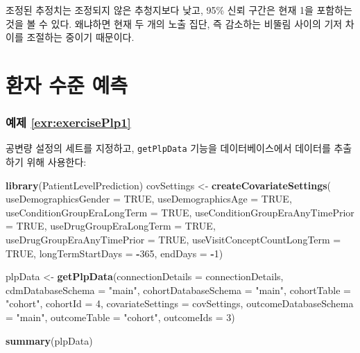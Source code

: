 \documentclass[11pt]{book}
\newenvironment{Shaded}{\begin{snugshade}}{\end{snugshade}}
\newcommand{\KeywordTok}[1]{\textcolor[rgb]{0.13,0.29,0.53}{\textbf{#1}}}
\newcommand{\DataTypeTok}[1]{\textcolor[rgb]{0.13,0.29,0.53}{#1}}
\newcommand{\DecValTok}[1]{\textcolor[rgb]{0.00,0.00,0.81}{#1}}
\newcommand{\StringTok}[1]{\textcolor[rgb]{0.31,0.60,0.02}{#1}}
\newcommand{\OtherTok}[1]{\textcolor[rgb]{0.56,0.35,0.01}{#1}}
\newcommand{\OperatorTok}[1]{\textcolor[rgb]{0.81,0.36,0.00}{\textbf{#1}}}
\newcommand{\NormalTok}[1]{#1}
\theoremstyle{definition}
\theoremstyle{definition}
\theoremstyle{definition}
\theoremstyle{remark}
\begin{document}
조정된 추정치는 조정되지 않은 추청지보다 낮고, 95\% 신뢰 구간은 현재 1을
포함하는 것을 볼 수 있다. 왜냐하면 현재 두 개의 노출 집단, 즉 감소하는
비뚤림 사이의 기저 차이를 조절하는 중이기 때문이다.

\section{환자 수준 예측}\label{Plpanswers}

\subsubsection*{예제 \ref{exr:exercisePlp1}}\label{-refexrexerciseplp1}

공변량 설정의 세트를 지정하고, \texttt{getPlpData} 기능을
데이터베이스에서 데이터를 추출하기 위해 사용한다:

\begin{Shaded}
\begin{Highlighting}[]
\KeywordTok{library}\NormalTok{(PatientLevelPrediction)}
\NormalTok{covSettings <-}\StringTok{ }\KeywordTok{createCovariateSettings}\NormalTok{(}
  \DataTypeTok{useDemographicsGender =} \OtherTok{TRUE}\NormalTok{,}
  \DataTypeTok{useDemographicsAge =} \OtherTok{TRUE}\NormalTok{,}
  \DataTypeTok{useConditionGroupEraLongTerm =} \OtherTok{TRUE}\NormalTok{,}
  \DataTypeTok{useConditionGroupEraAnyTimePrior =} \OtherTok{TRUE}\NormalTok{,}
  \DataTypeTok{useDrugGroupEraLongTerm =} \OtherTok{TRUE}\NormalTok{,}
  \DataTypeTok{useDrugGroupEraAnyTimePrior =} \OtherTok{TRUE}\NormalTok{,}
  \DataTypeTok{useVisitConceptCountLongTerm =} \OtherTok{TRUE}\NormalTok{,}
  \DataTypeTok{longTermStartDays =} \OperatorTok{-}\DecValTok{365}\NormalTok{,}
  \DataTypeTok{endDays =} \OperatorTok{-}\DecValTok{1}\NormalTok{)}

\NormalTok{plpData <-}\StringTok{ }\KeywordTok{getPlpData}\NormalTok{(}\DataTypeTok{connectionDetails =}\NormalTok{ connectionDetails,}
                      \DataTypeTok{cdmDatabaseSchema =} \StringTok{"main"}\NormalTok{,}
                      \DataTypeTok{cohortDatabaseSchema =} \StringTok{"main"}\NormalTok{,}
                      \DataTypeTok{cohortTable =} \StringTok{"cohort"}\NormalTok{,}
                      \DataTypeTok{cohortId =} \DecValTok{4}\NormalTok{,}
                      \DataTypeTok{covariateSettings =}\NormalTok{ covSettings,}
                      \DataTypeTok{outcomeDatabaseSchema =} \StringTok{"main"}\NormalTok{,}
                      \DataTypeTok{outcomeTable =} \StringTok{"cohort"}\NormalTok{,}
                      \DataTypeTok{outcomeIds =} \DecValTok{3}\NormalTok{)}

\KeywordTok{summary}\NormalTok{(plpData)}
\end{Highlighting}
\end{Shaded}
\end{document}

